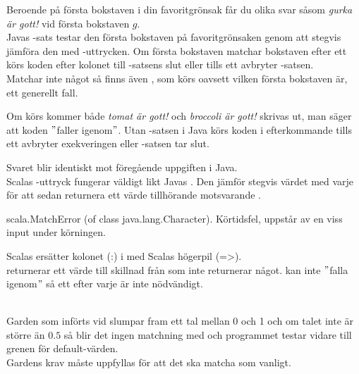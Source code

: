 

\ExerciseSolution{\ExeWeekEIGHT}


\Task

\Subtask Beroende på första bokstaven i din favoritgrönsak får du olika svar såsom \textit{gurka är gott!} vid första bokstaven $g$.\\
Javas -sats testar den första bokstaven på favoritgrönsaken genom att stegvis jämföra den med -uttrycken. Om första bokstaven  matchar bokstaven efter ett  körs koden efter kolonet till -satsens slut eller tills ett  avbryter -satsen.\\
Matchar inte  något  så finns även , som körs oavsett vilken första bokstaven är, ett generellt fall.

\Subtask Om  körs kommer både  \textit{tomat är gott!} och \textit{broccoli är gott!} skrivas ut, man säger att koden $"$faller igenom$"$. Utan -satsen i Java körs koden i efterkommande  tills ett  avbryter exekveringen eller -satsen tar slut.
 

\Task 

\Subtask Svaret blir identiskt mot föregående uppgiften i Java.\\
Scalas -uttryck fungerar väldigt likt Javas . Den jämför stegvis värdet med varje  för att sedan returnera ett värde tillhörande motsvarande .

\Subtask scala.MatchError (of class java.lang.Character). Körtidsfel, uppstår av en viss input under körningen.

\Subtask Scalas  ersätter kolonet (:) i  med Scalas högerpil (=>).\\
 returnerar ett värde till skillnad från  som inte returnerar något.
 kan inte $"$falla igenom$"$ så ett  efter varje  är inte nödvändigt.


\Task 
\\
Garden som införts vid  slumpar fram ett tal mellan 0 och 1 och om talet inte är större än $0.5$ så blir det ingen matchning med  och programmet testar vidare till grenen för default-värden.\\
Gardens krav måste uppfyllas för att det ska matcha som vanligt.


